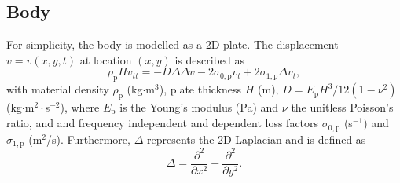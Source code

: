 \documentclass[reprint,NumberedRefs]{JASAnew}
\begin{document}
\subsection{Body}
For simplicity, the body is modelled as a 2D plate. The displacement $v = v(x,y,t)$ at location $(x,y)$ is described as
\begin{equation}
    \rho_\text{p} H v_{tt}=-D\Delta\Delta v-2\sigma_{0,\text{p}}v_t+2\sigma_{1,\text{p}}\Delta v_t,
\end{equation}
with material density $\rho_\text{p}$ (kg$\cdot$m$^3$), plate thickness $H$ (m), $D = E_\text{p}H^3/12(1-\nu^2)$ (kg$\cdot$m$^2\cdot$s$^{-2}$), where $E_\text{p}$ is the Young's modulus (Pa) and $\nu$ the unitless Poisson's ratio, and and frequency independent and dependent loss factors $\sigma_{0,\text{p}}$ (s$^{-1}$) and $\sigma_{1,\text{p}}$ (m$^2$/s). Furthermore, $\Delta$ represents the 2D Laplacian and is defined as
\begin{equation}
    \Delta = \frac{\partial^2}{\partial x^2} + \frac{\partial^2}{\partial y^2}.
\end{equation}
\end{document}
